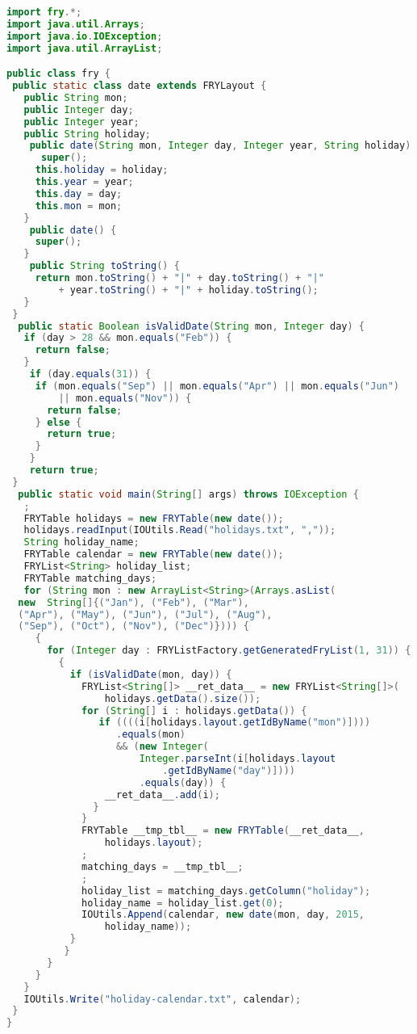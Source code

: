 \documentclass{article}
\begin{document}
\begin{lstlisting}[language=Java,
basicstyle=\ttm,
commentstyle=\color{comment}\ttm,
otherkeywords={},             % Add keywords here
keywordstyle=\ttb\color{deepblue},
stringstyle=\color{deepgreen},
frame=tb,                         % Any extra options here
showstringspaces=false,            
breaklines=true]
import fry.*;
import java.util.Arrays;
import java.io.IOException;
import java.util.ArrayList;

public class fry {
 public static class date extends FRYLayout {
   public String mon;
   public Integer day;
   public Integer year;
   public String holiday;
    public date(String mon, Integer day, Integer year, String holiday) {
      super();
     this.holiday = holiday;
     this.year = year;
     this.day = day;
     this.mon = mon;
   }
    public date() {
     super();
   }
    public String toString() {
     return mon.toString() + "|" + day.toString() + "|"
         + year.toString() + "|" + holiday.toString();
   }
 }
  public static Boolean isValidDate(String mon, Integer day) {
   if (day > 28 && mon.equals("Feb")) {
     return false;
   }
    if (day.equals(31)) {
     if (mon.equals("Sep") || mon.equals("Apr") || mon.equals("Jun")
         || mon.equals("Nov")) {
       return false;
     } else {
       return true;
     }
    }
    return true;
 }
  public static void main(String[] args) throws IOException {
   ;
   FRYTable holidays = new FRYTable(new date());
   holidays.readInput(IOUtils.Read("holidays.txt", ","));
   String holiday_name;
   FRYTable calendar = new FRYTable(new date());
   FRYList<String> holiday_list;
   FRYTable matching_days;
   for (String mon : new ArrayList<String>(Arrays.asList(
  new  String[]{("Jan"), ("Feb"), ("Mar"), 
  ("Apr"), ("May"), ("Jun"), ("Jul"), ("Aug"), 
  ("Sep"), ("Oct"), ("Nov"), ("Dec")}))) {
     {
       for (Integer day : FRYListFactory.getGeneratedFryList(1, 31)) {
         {
           if (isValidDate(mon, day)) {
             FRYList<String[]> __ret_data__ = new FRYList<String[]>(
                 holidays.getData().size());
             for (String[] i : holidays.getData()) {
                if ((((i[holidays.layout.getIdByName("mon")])))
                   .equals(mon)
                   && (new Integer(
                       Integer.parseInt(i[holidays.layout
                           .getIdByName("day")])))
                       .equals(day)) {
                 __ret_data__.add(i);
               }
             }
             FRYTable __tmp_tbl__ = new FRYTable(__ret_data__,
                 holidays.layout);
             ;
             matching_days = __tmp_tbl__;
             ;
             holiday_list = matching_days.getColumn("holiday");
             holiday_name = holiday_list.get(0);
             IOUtils.Append(calendar, new date(mon, day, 2015,
                 holiday_name));
           }
          }
       }
     }
   }
   IOUtils.Write("holiday-calendar.txt", calendar);
 }
}
\end{lstlisting}
\end{document}
